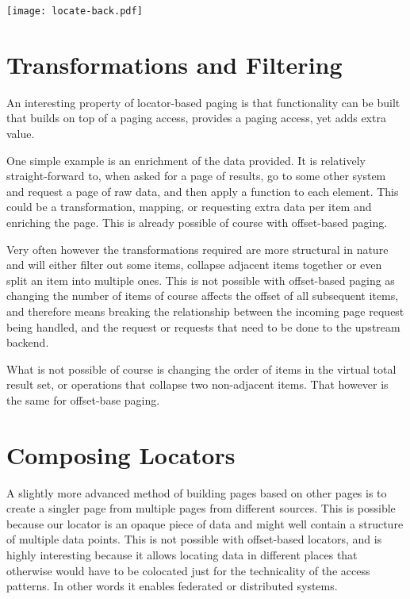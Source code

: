 \documentclass[11pt,a4paper]{article}
\begin{document}
\begin{multicols}{2}
\texttt{[image: locate-back.pdf]}

\section*{Transformations and Filtering}

An interesting property of locator-based paging is that functionality can be
built that builds on top of a paging access, provides a paging access, yet adds
extra value.

One simple example is an enrichment of the data provided. It is relatively
straight-forward to, when asked for a page of results, go to some other system
and request a page of raw data, and then apply a function to each element. This
could be a transformation, mapping, or requesting extra data per item and
enriching the page. This is already possible of course with offset-based
paging.

Very often however the transformations required are more structural in nature
and will either filter out some items, collapse adjacent items together or even
split an item into multiple ones. This is not possible with offset-based paging
as changing the number of items of course affects the offset of all subsequent
items, and therefore means breaking the relationship between the incoming page
request being handled, and the request or requests that need to be done to the
upstream backend.


What is not possible of course is changing the order of items in the virtual
total result set, or operations that collapse two non-adjacent items. That
however is the same for offset-base paging.

\section*{Composing Locators}

A slightly more advanced method of building pages based on other pages is to
create a singler page from multiple pages from different sources. This is
possible because our locator is an opaque piece of data and might well contain a
structure of multiple data points. This is not possible with offset-based
locators, and is highly interesting because it allows locating data in different
places that otherwise would have to be colocated just for the technicality of
the access patterns. In other words it enables federated or distributed systems.


\end{multicols}
\end{document}
